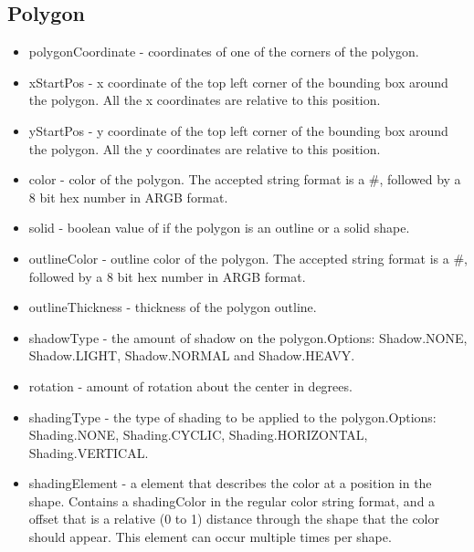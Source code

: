 \documentclass{article}
\begin{document}
\subsection{Polygon}
\begin{itemize}
\item polygonCoordinate - coordinates of one of the corners of the polygon.
\item xStartPos - x coordinate of the top left corner of the bounding box around the polygon. All the x coordinates are relative to this position.
\item yStartPos - y coordinate of the top left corner of the bounding box around the polygon. All the y coordinates are relative to this position.
\item color - color of the polygon. The accepted string format is a \#, followed by a 8 bit hex number in ARGB format.
\item solid - boolean value of if the polygon is an outline or a solid shape.
\item outlineColor - outline color of the polygon. The accepted string format is a \#, followed by a 8 bit hex number in ARGB format.
\item outlineThickness - thickness of the polygon outline.
\item shadowType - the amount of shadow on the polygon.\newline  Options: Shadow.NONE, Shadow.LIGHT, Shadow.NORMAL and Shadow.HEAVY.
\item rotation - amount of rotation about the center in degrees. 
\item shadingType - the type of shading to be applied to the polygon.\newline  Options: Shading.NONE, Shading.CYCLIC, Shading.HORIZONTAL, Shading.VERTICAL.
\item shadingElement - a element that describes the color at a position in the shape. Contains a shadingColor in the regular color string format, and a offset that is a relative (0 to 1) distance through the shape that the color should appear. This element can occur multiple times per shape.
\end{itemize}
\end{document}
